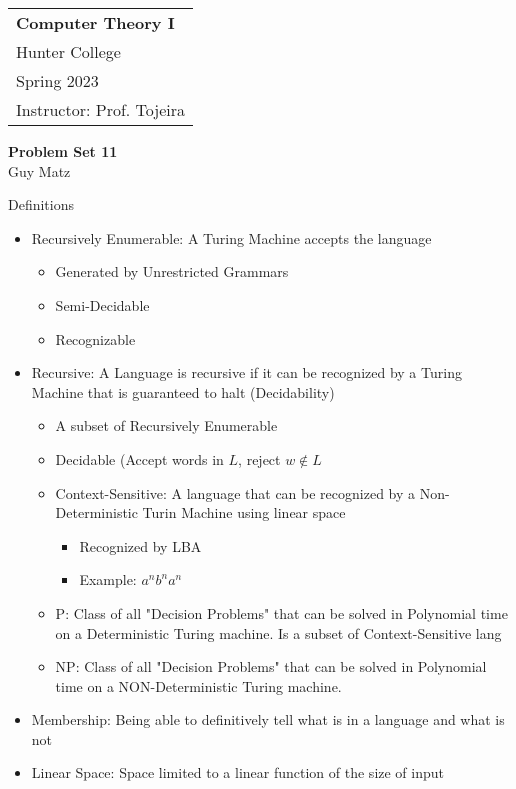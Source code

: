\documentclass[12pt]{scrbook}
\author{Guy Matz}
\begin{document}
  \begin{tabular}{p{15.5cm}}
    {\large \textbf{Computer Theory I}} \\
    Hunter College \\
    Spring 2023  \\
    Instructor: Prof. Tojeira\\
    \hline
  \end{tabular}
  \begin{center}
    {\Large \textbf{Problem Set 11}}
    \vspace{2mm}\\
    Guy Matz
  \end{center}

  Definitions
  \begin{itemize}
    \item Recursively Enumerable: A Turing Machine accepts the language
      \begin{itemize}
        \item Generated by Unrestricted Grammars
        \item Semi-Decidable
        \item Recognizable
      \end{itemize}
      \item Recursive: A Language is recursive if it can be recognized by a
        Turing Machine that is guaranteed to halt (Decidability)
      \begin{itemize}
        \item A subset of Recursively Enumerable
        \item Decidable (Accept words in $L$, reject $w \notin L$
      \end{itemize}
    \begin{itemize}
      \item Context-Sensitive: A language that can be recognized by a Non-Deterministic Turin Machine
        using linear space
      \begin{itemize}
        \item Recognized by LBA
        \item Example: $a^nb^na^n$
      \end{itemize}
      \item P: Class of all "Decision Problems" that can be solved in Polynomial time
        on a Deterministic Turing machine.  Is a subset of Context-Sensitive lang
      \item NP: Class of all "Decision Problems" that can be solved in Polynomial time
        on a NON-Deterministic Turing machine.
    \end{itemize}
    \item Membership: Being able to definitively tell what is in a language
      and what is not
    \item Linear Space: Space limited to a linear function of the size of input

  \end{itemize}
\end{document}
